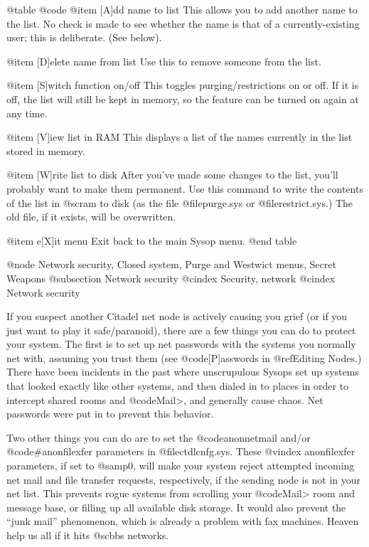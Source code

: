 @table @code
@item [A]dd name to list
This allows you to add another name to
the list.  No check is made to see whether
the name is that of a currently-existing user;
this is deliberate.  (See below).

@item [D]elete name from list
Use this to remove someone from the list.

@item [S]witch function on/off
This toggles purging/restrictions on or off.
If it is off, the list will still be kept in memory, so
the feature can be turned on again at any time.

@item [V]iew list in RAM
This displays a list of the names currently in
the list stored in memory.

@item [W]rite list to disk
After you've made some changes to the
list, you'll probably want to make them permanent.  Use
this command to write the contents of the list in @sc{ram} to
disk (as the file @file{purge.sys} or @file{restrict.sys}.)  The old
file, if it exists, will be overwritten.

@item e[X]it menu
Exit back to the main Sysop menu.
@end table

@node Network security, Closed system, Purge and Westwict menus, Secret Weapons
@subsection Network security
@cindex Security, network
@cindex Network security

If you suspect another Citadel net node is actively
causing you grief (or if you just want to play it safe/paranoid), there
are a few things you can do to protect your system.  The first
is to set up net passwords with the systems
you normally net with, assuming you trust them (see @code{[P]asswords} in
@ref{Editing Nodes}.)  There have been
incidents in the past where unscrupulous Sysops set up systems
that looked exactly like other systems, and then dialed in to
places in order to intercept shared rooms and @code{Mail>}, and generally
cause chaos.  Net passwords were put in to prevent this behavior.

Two other things you can do are to set the @code{anonnetmail}
and/or @code{#anonfilexfer} parameters in @file{ctdlcnfg.sys}.  These
@vindex anonfilexfer
parameters, if set to @samp{0}, will make your system reject attempted
incoming net mail and file transfer requests, respectively, if the
sending node is not in your net list.  This prevents rogue
systems from scrolling your @code{Mail>} room and message base, or
filling up all available disk storage.  It would also prevent
the ``junk mail'' phenomenon, which is already a problem with fax
machines.  Heaven help us all if it hits @sc{bbs} networks.

